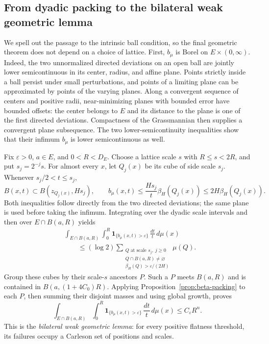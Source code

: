 \subsection{From dyadic packing to the bilateral weak geometric lemma}

We spell out the passage to the intrinsic ball condition, so the final
geometric theorem does not depend on a choice of lattice.  First,
$b_\mu$ is Borel on $E\times(0,\infty)$.  Indeed, the two unnormalized
directed deviations on an open ball are jointly lower semicontinuous
in its center, radius, and affine plane.  Points strictly inside a ball
persist under small perturbations, and points of a limiting plane can
be approximated by points of the varying planes.  Along a convergent
sequence of centers and positive radii, near-minimizing planes with
bounded error have bounded offsets: the center belongs to $E$ and its
distance to the plane is one of the first directed deviations.
Compactness of the Grassmannian then supplies a convergent plane
subsequence.  The two lower-semicontinuity inequalities show that their
infimum $b_\mu$ is lower semicontinuous as well.

Fix $\varepsilon>0$, $a\in E$, and $0<R<D_E$.  Choose a lattice scale
$s$ with $R\leq s<2R$, and put $s_j=2^{-j}s$.  For almost every $x$,
let $Q_j(x)$ be its cube of side scale $s_j$.  Whenever
$s_j/2<t\leq s_j$,
\[
 B(x,t)\subset B(z_{Q_j(x)},Hs_j),\qquad
 b_\mu(x,t)\leq\frac{Hs_j}{t}\beta_H(Q_j(x))
                  \leq2H\beta_H(Q_j(x)).
\]
Both inequalities follow directly from the two directed deviations;
the same plane is used before taking the infimum.  Integrating over
the dyadic scale intervals and then over $E\cap B(a,R)$ yields
\begin{align*}
 &\int_{E\cap B(a,R)}\int_0^R
       \mathbf1_{\{b_\mu(x,t)>\varepsilon\}}\,\frac{dt}{t}\,d\mu(x)\\
 &\qquad\leq(\log2)
   \sum_{\substack{Q\text{ at scale }s_j,\ j\geq0\\
          Q\cap B(a,R)\ne\varnothing\\
          \beta_H(Q)>\varepsilon/(2H)}}\mu(Q).
\end{align*}
Group these cubes by their scale-$s$ ancestors $P$.  Such a $P$ meets
$B(a,R)$ and is contained in $B(a,(1+4C_0)R)$.  Applying
Proposition~\ref{prop:beta-packing} to each $P$, then summing their
disjoint masses and using global growth, proves
\begin{equation}\label{eq:continuous-bwgl}
 \int_{E\cap B(a,R)}\int_0^R
       \mathbf1_{\{b_\mu(x,t)>\varepsilon\}}\,\frac{dt}{t}\,d\mu(x)
 \leq C_\varepsilon R^n.
\end{equation}
This is the \emph{bilateral weak geometric lemma}: for every positive
flatness threshold, its failures occupy a Carleson set of positions
and scales.

